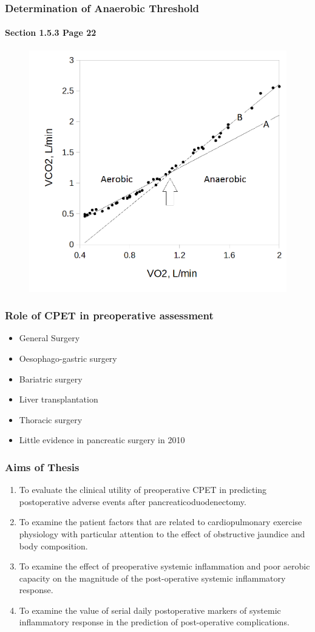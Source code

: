 \documentclass[10pt]{beamer}
\begin{document}
\begin{frame}
	\frametitle{Determination of Anaerobic Threshold}
	\framesubtitle{Section 1.5.3 Page 22}
	\begin{figure}[htbp]
		\centering
		\includegraphics[width=0.7\linewidth]{../Figures/cpet_vslope}
		\label{fig:cpet_vslope}
	\end{figure}
\end{frame}

\begin{frame}
	\frametitle{Role of CPET in preoperative assessment}
	\begin{itemize}
		\item General Surgery
		\item Oesophago-gastric surgery
		\item Bariatric surgery
		\item Liver transplantation
		\item Thoracic surgery
		\medskip
		\item Little evidence in pancreatic surgery in 2010
		
	\end{itemize}
\end{frame}

\begin{frame}
	\frametitle{Aims of Thesis}
	\begin{enumerate}
		\item To evaluate the clinical utility of preoperative CPET in predicting postoperative adverse events after pancreaticoduodenectomy.
		\item To examine the patient factors that are related to cardiopulmonary exercise physiology with particular attention to the effect of obstructive jaundice and body composition.
		\item To examine the effect of preoperative systemic inflammation and poor aerobic capacity on the magnitude of the post-operative systemic inflammatory response.
		\item To examine the value of serial daily postoperative markers of systemic inflammatory response in the prediction of post-operative complications.
	\end{enumerate}
\end{frame}
\end{document}
